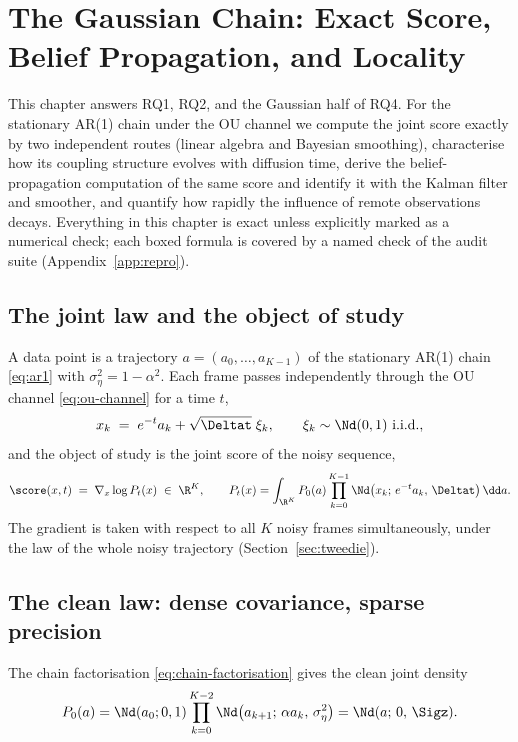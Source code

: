 \chapter{The Gaussian Chain: Exact Score, Belief Propagation, and
Locality}\label{ch:gaussian}\label{ch:bp}

This chapter answers RQ1, RQ2, and the Gaussian half of RQ4. For the
stationary AR(1) chain under the OU channel we compute the joint score
exactly by two independent routes (linear algebra and Bayesian smoothing),
characterise how its coupling structure evolves with diffusion time,
derive the belief-propagation computation of the same score and identify
it with the Kalman filter and smoother, and quantify how rapidly the
influence of remote observations decays. Everything in this chapter is
exact unless explicitly marked as a numerical check; each boxed formula is
covered by a named check of the audit suite (Appendix~\ref{app:repro}).

\section{The joint law and the object of study}\label{sec:g-model}

A data point is a trajectory $a = (a_0, \dots, a_{K-1})$ of the stationary
AR(1) chain \eqref{eq:ar1} with $\sigma_\eta^2 = 1 - \alpha^2$. Each frame
passes independently through the OU channel \eqref{eq:ou-channel} for a
time $t$,
\begin{equation}
  x_k \;=\; e^{-t} a_k + \sqrt{\Deltat}\;\xi_k,
  \qquad \xi_k \sim \Nd(0,1)\ \text{i.i.d.},
  \label{eq:g-channel}
\end{equation}
and the object of study is the joint score of the noisy sequence,
\begin{equation}
  \score(x, t) \;=\; \nabla_x \log P_t(x) \;\in\; \R^K,
  \qquad
  P_t(x) = \int_{\R^K} P_0(a) \prod_{k=0}^{K-1}
    \Nd\big(x_k;\, e^{-t}a_k,\, \Deltat\big)\, \dd a .
  \label{eq:g-object}
\end{equation}
The gradient is taken with respect to all $K$ noisy frames simultaneously,
under the law of the whole noisy trajectory
(Section~\ref{sec:tweedie}).

\section{The clean law: dense covariance, sparse precision}
\label{sec:g-clean}

The chain factorisation \eqref{eq:chain-factorisation} gives the clean
joint density
\begin{equation}
  P_0(a)
  = \Nd(a_0; 0, 1) \prod_{k=0}^{K-2}
    \Nd\big(a_{k+1};\, \alpha a_k,\, \sigma_\eta^2\big)
  = \Nd(a;\, 0,\, \Sigz).
  \label{eq:g-P0}
\end{equation}

